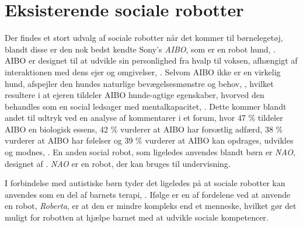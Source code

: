 \section{Eksisterende sociale robotter}
\label{EksisterendeSocialeRobotter}
%
Der findes et stort udvalg af sociale robotter når det kommer til børnelegetøj, blandt disse er den nok bedst kendte Sony's \textit{AIBO}, som er en robot hund, \parencite{WEB:AIBO}. AIBO er designet til at udvikle sin personlighed fra hvalp til voksen, afhængigt af interaktionen med dens ejer og omgivelser, \parencite{WEB:AIBO}. Selvom AIBO ikke er en virkelig hund, afspejler den hundes naturlige bevægelsesmønstre og behov, \parencite[ss. 191-198]{PDF:AnEthologicalEmotional}, hvilket resultere i at ejeren tildeler AIBO hunde-agtige egenskaber, hvorved den behandles som en social ledsager med mentalkapacitet, \parencite[s. 2]{PDF:SharingALifeHarvey}. Dette kommer blandt andet til udtryk ved en analyse af kommentarer i et forum, hvor 47 \% tildeler AIBO en biologisk essens, 42 \% vurderer at AIBO har forsætlig adfærd, 38 \% vurderer at AIBO har følelser og 39 \% vurderer at AIBO kan opdrages, udvikles og modnes, \parencite[s. 26]{PDF:InTheCompanyofRobots}. En anden social robot, som ligeledes anvendes blandt børn er \textit{NAO}, designet af \textcite{WEB:NAO}. \textit{NAO} er en robot, der kan bruges til undervisning.  

I forbindelse med autistiske børn tyder det ligeledes på at sociale robotter kan anvendes som en del af barnets terapi, \parencite[s. 180]{PDF:GamesChrildrenAutism}. Ifølge \textcite[s. 185]{PDF:GamesChrildrenAutism} er en af fordelene ved at anvende en robot, \textit{Roberta}, er at den er mindre kompleks end et menneske, hvilket gør det muligt for robotten at hjælpe barnet med at udvikle sociale kompetencer. 

